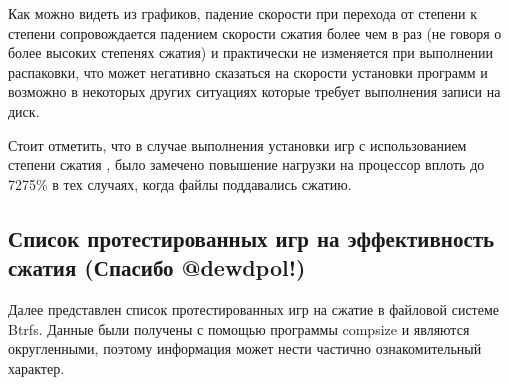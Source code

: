 \documentclass[letterpaper,10pt,russian,openany]{sphinxmanual}
\begin{document}
\noindent{}

\noindent{}

\noindent{}

\sphinxAtStartPar
Как можно видеть из графиков, падение скорости при перехода от степени  к степени  сопровождается падением скорости сжатия более чем в  раз
(не говоря о более высоких степенях сжатия) и практически не изменяется при выполнении распаковки,
что может негативно сказаться на скорости установки программ и возможно в некоторых других ситуациях которые требует выполнения записи на диск.

\sphinxAtStartPar
Стоит отметить, что в случае выполнения установки игр с использованием степени сжатия ,
было замечено повышение нагрузки на процессор вплоть до 72\sphinxhyphen{}75\% в тех случаях, когда файлы поддавались сжатию.

\ignorespaces 

\subsection{Список протестированных игр на эффективность сжатия (Спасибо @dewdpol!)}
\label{\detokenize{source/file-systems:dewdpol}}\label{\detokenize{source/file-systems:comparison-table}}\label{\detokenize{source/file-systems:index-5}}
\sphinxAtStartPar
Далее представлен список протестированных игр на сжатие в файловой системе Btrfs.
Данные были получены с помощью программы compsize и являются округленными, поэтому информация может нести частично ознакомительный характер.
\end{document}
